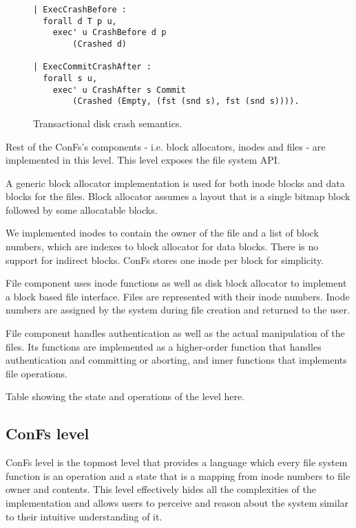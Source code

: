\begin{figure}[ht]
    \centering
\begin{verbatim}
| ExecCrashBefore :
  forall d T p u,
    exec' u CrashBefore d p 
        (Crashed d)

| ExecCommitCrashAfter :
  forall s u,
    exec' u CrashAfter s Commit 
        (Crashed (Empty, (fst (snd s), fst (snd s)))).
\end{verbatim}
    \caption{Transactional disk crash semantics.}
    \label{fig:TD_Crash_Semantics}
\end{figure}

Rest of the ConFs's components - i.e. block allocators, inodes and files - are implemented in this level. This level exposes the file system API.

A generic block allocator implementation is used for both inode blocks and data blocks for the files. Block allocator assumes a layout that is a single bitmap block followed by some allocatable blocks.

We implemented inodes to contain the owner of the file and a list of block numbers, which are indexes to block allocator for data blocks. There is no support for indirect blocks. ConFs stores one inode per block for simplicity.

File component uses inode functions as well as disk block allocator to implement a block based file interface. Files are represented with their inode numbers. Inode numbers are assigned by the system during file creation and returned to the user.

File component handles authentication as well as the actual manipulation of the files. Its functions are implemented as a higher-order function that handles authentication and committing or aborting, and inner functions that implements file operations.

{\color{red} Table showing the state and operations of the level here}.

\subsection{ConFs level}
ConFs level is the topmost level that provides a language which every file system function is an operation and a state that is a mapping from inode numbers to file owner and contents. This level effectively hides all the complexities of the implementation and allows users to perceive and reason about the system similar to their intuitive understanding of it.

